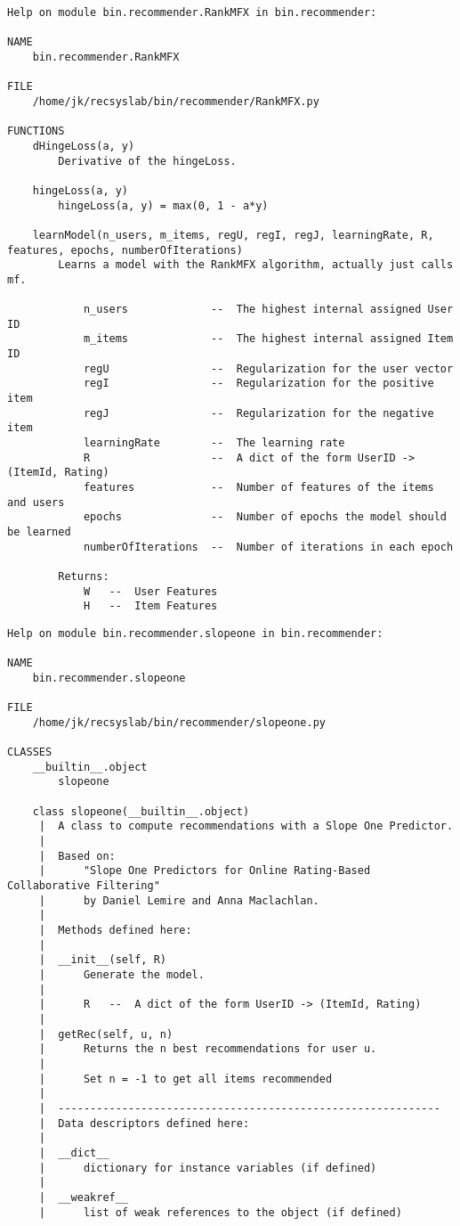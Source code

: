 \begin{lstlisting}[style=docstring]
Help on module bin.recommender.RankMFX in bin.recommender:

NAME
    bin.recommender.RankMFX

FILE
    /home/jk/recsyslab/bin/recommender/RankMFX.py

FUNCTIONS
    dHingeLoss(a, y)
        Derivative of the hingeLoss.
    
    hingeLoss(a, y)
        hingeLoss(a, y) = max(0, 1 - a*y)
    
    learnModel(n_users, m_items, regU, regI, regJ, learningRate, R, features, epochs, numberOfIterations)
        Learns a model with the RankMFX algorithm, actually just calls mf.
        
            n_users             --  The highest internal assigned User ID
            m_items             --  The highest internal assigned Item ID
            regU                --  Regularization for the user vector
            regI                --  Regularization for the positive item
            regJ                --  Regularization for the negative item
            learningRate        --  The learning rate
            R                   --  A dict of the form UserID -> (ItemId, Rating)
            features            --  Number of features of the items and users
            epochs              --  Number of epochs the model should be learned
            numberOfIterations  --  Number of iterations in each epoch
        
        Returns:
            W   --  User Features
            H   --  Item Features
\end{lstlisting}

\begin{lstlisting}[style=docstring]
Help on module bin.recommender.slopeone in bin.recommender:

NAME
    bin.recommender.slopeone

FILE
    /home/jk/recsyslab/bin/recommender/slopeone.py

CLASSES
    __builtin__.object
        slopeone
    
    class slopeone(__builtin__.object)
     |  A class to compute recommendations with a Slope One Predictor.
     |  
     |  Based on:
     |      "Slope One Predictors for Online Rating-Based Collaborative Filtering"
     |      by Daniel Lemire and Anna Maclachlan.
     |  
     |  Methods defined here:
     |  
     |  __init__(self, R)
     |      Generate the model.
     |      
     |      R   --  A dict of the form UserID -> (ItemId, Rating)
     |  
     |  getRec(self, u, n)
     |      Returns the n best recommendations for user u.
     |      
     |      Set n = -1 to get all items recommended
     |  
     |  ------------------------------------------------------------
     |  Data descriptors defined here:
     |  
     |  __dict__
     |      dictionary for instance variables (if defined)
     |  
     |  __weakref__
     |      list of weak references to the object (if defined)
\end{lstlisting}

